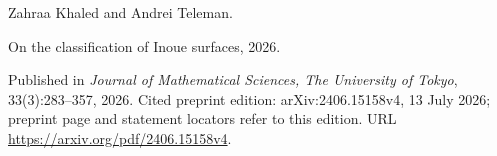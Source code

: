 Zahraa Khaled and Andrei Teleman.

\newblock On the classification of {Inoue} surfaces, 2026{}.

\newblock Published in \emph{Journal of Mathematical Sciences, The University
of Tokyo}, 33(3):283--357, 2026.
\newblock Cited preprint edition: arXiv:2406.15158v4, 13 July 2026;
preprint page and statement locators refer to this edition.
\newblock URL \url{https://arxiv.org/pdf/2406.15158v4}.

